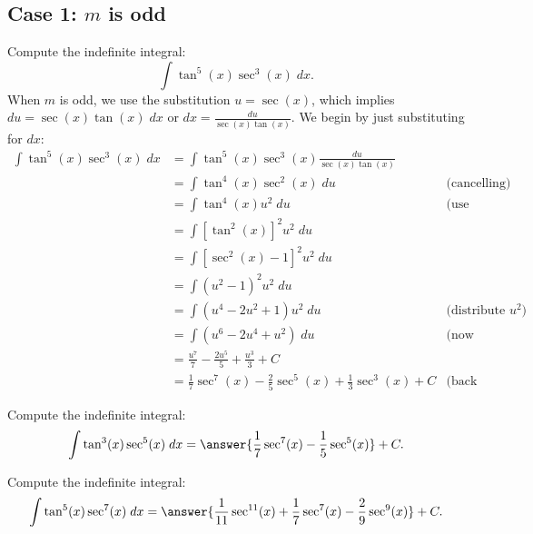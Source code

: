 \documentclass{ximera}
\begin{document}
\subsection{Case 1: $m$ is odd}
\begin{example}
Compute the indefinite integral:
\[
\int \tan^5(x) \sec^3(x)\;dx.
\]
When $m$ is odd, we use the substitution $u = \sec(x)$,
which implies $du = \sec(x) \tan(x) \; dx$ or $dx = \frac{du}{\sec(x)\tan(x)}$.
We begin by just substituting for $dx$:
\begin{align*}
\int \tan^5(x) \sec^3(x)\;dx &= \int \tan^5(x) \sec^3(x) \frac{du}{\sec(x)\tan(x)}\\
&= \int \tan^4(x) \sec^2(x) \; du & \text{(cancelling)}\\
&= \int \tan^4(x) u^2 \; du & \text{(use Pythagorean identity)}\\
&= \int \left[\tan^2(x)\right]^2 u^2 \; du \\
&= \int \left[\sec^2(x) -1\right]^2 u^2 \; du \\
&= \int \left(u^2 -1\right)^2 u^2 \; du \\
&= \int \left(u^4 - 2u^2 +1\right) u^2 \; du & \text{(distribute $u^2$)}\\
&= \int \left(u^6 - 2u^4 +u^2\right) \; du & \text{(now integrate)}\\
&=  \frac{u^7}{7} - \frac{2u^5}{5} + \frac{u^3}{3} + C  \\
&= \frac17\sec^7(x) - \frac25 \sec^5(x) + \frac13 \sec^3(x) + C & \text{(back substituting)}
\end{align*}
\end{example}

\begin{problem}
Compute the indefinite integral:
\[
\int \tan^3(x) \sec^5(x)\;dx = \answer{\frac17 \sec^7(x) - \frac15 \sec^5(x)} + C.
\]
\end{problem}

\begin{problem}
Compute the indefinite integral:
\[
\int \tan^5(x) \sec^7(x)\;dx = \answer{\frac{1}{11} \sec^{11}(x) + \frac17 \sec^7(x) -\frac29 \sec^9(x)} + C.
\]
\end{problem}
\end{document}
